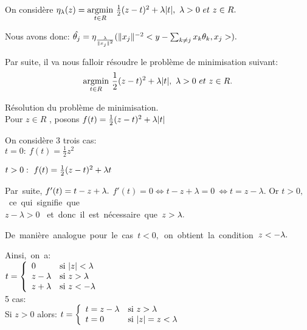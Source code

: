 \documentclass{article}
\begin{document}
On considère $\eta_\lambda(z) = \underset{t \in R}{\mathrm{argmin}}\ \frac{1}{2} (z-t)^2 + \lambda|t| ,\ \lambda > 0\ et\ z \in R.\\ $ 

Nous avons donc: $\hat{\theta_j}=\eta_\frac{\lambda}{\|x_j\|^2}( \|x_j\|^{-2}<y - \sum_{k \ne j} x_k\theta_k,x_j>). \\ $

Par suite, il va nous falloir résoudre le problème de minimisation suivant: $$\underset{t \in R}{\mathrm{argmin}}\ \frac{1}{2} (z-t)^2 + \lambda|t| ,\ \lambda > 0\ et\ z \in R.\\ $$

Résolution du problème de minimisation.\\

Pour $z \in R$ , posons $f(t) = \frac{1}{2} (z-t)^2 + \lambda|t| \\ $ 

On considère 3 trois cas: \\

$t = 0:\ f(t) = \frac{1}{2}z^2$

$t > 0:\ f(t) = \frac{1}{2}(z-t)^2 + \lambda t \\ $ 

Par\ suite, $f'(t) = t-z+\lambda. \\ $
$f'(t) = 0 \Longleftrightarrow t-z+ \lambda = 0\
\Longleftrightarrow t = z- \lambda.$ Or $t > 0,$\ ce\ qui\ signifie\  que \\ $z- \lambda > 0$ \ et\ donc\ il\ est\ nécessaire\ que\ $z > \lambda.\\ $


De\ manière\ analogue\ pour\ le\ cas\ $t < 0,$\ on\ obtient\ la\ condition\ $z < -\lambda. \\ $

Ainsi,\ on\ a:\\

$t = \left\{
    \begin{array}{lll}
        0 & \mbox{si } |z| < \lambda \\
        z - \lambda & \mbox{si } z > \lambda \\
        z+ \lambda & \mbox{si } z < - \lambda
    \end{array}
\right. \\ $ \\

5 cas:\\

Si $z > 0$ alors: 
$t = \left\{
    \begin{array}{lll}
        t = z - \lambda & \mbox{si } z > \lambda \\
        t = 0 & \mbox{si } |z| = z < \lambda 
    \end{array}
\right. \\ $
\end{document}
